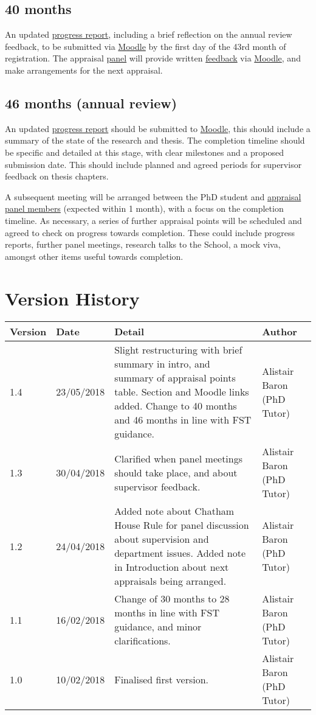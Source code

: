 \documentclass[12pt,a4paper]{article}
\begin{document}
\subsection{40 months} \label{sec:40months}
An updated \hyperref[sec:report]{progress report}, including a brief reflection on the annual review feedback, to be submitted via \href{https://modules.lancaster.ac.uk/course/view.php?id=7050}{Moodle}  by the first day of the 43rd month of registration. The appraisal \hyperref[sec:panel]{panel} will provide written \hyperref[sec:feedback]{feedback} via \href{https://modules.lancaster.ac.uk/course/view.php?id=7050}{Moodle}, and make arrangements for the next appraisal.


\subsection{46 months (annual review)} \label{sec:46months}
An updated \hyperref[sec:report]{progress report} should be submitted to \href{https://modules.lancaster.ac.uk/course/view.php?id=7050}{Moodle}, this should include a summary of the state of the research and thesis. The completion timeline should be specific and detailed at this stage, with clear milestones and a proposed submission date. This should include planned and agreed periods for supervisor feedback on thesis chapters.

A subsequent meeting will be arranged between the PhD student and \hyperref[sec:panel]{appraisal panel members} (expected within 1 month), with a focus on the completion timeline. As necessary, a series of further appraisal points will be scheduled and agreed to check on progress towards completion. These could include progress reports, further panel meetings, research talks to the School, a mock viva, amongst other items useful towards completion.


\section{Version History}
\begin{tabularx}{\textwidth}{llXl}
	\textbf{Version} & \textbf{Date} & \textbf{Detail} & \textbf{Author} \\ 
	\hline
	1.4 & 23/05/2018 & Slight restructuring with brief summary in intro, and summary of appraisal points table. Section and Moodle links added. Change to 40 months and 46 months in line with FST guidance. & Alistair Baron (PhD Tutor) \\
	1.3 & 30/04/2018 & Clarified when panel meetings should take place, and about supervisor feedback. & Alistair Baron (PhD Tutor) \\
	1.2	& 24/04/2018 & Added note about Chatham House Rule for panel discussion about supervision and department issues. Added note in Introduction about next appraisals being arranged. & Alistair Baron (PhD Tutor) \\
	1.1	& 16/02/2018 & Change of 30 months to 28 months in line with FST guidance, and minor clarifications. & Alistair Baron (PhD Tutor) \\
	1.0 & 10/02/2018 & Finalised first version. & Alistair Baron (PhD Tutor) \\ 
\end{tabularx} 
\end{document}
